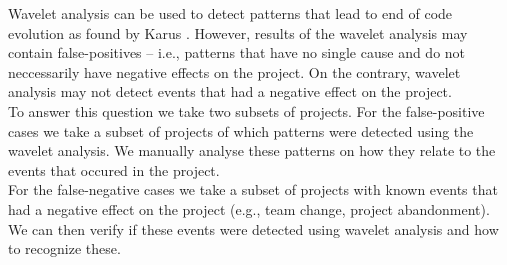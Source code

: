 Wavelet analysis can be used to detect patterns that lead to end of code
evolution as found by Karus \cite{karus2013}. However, results of the wavelet
analysis may contain false-positives -- i.e., patterns that have no single
cause and do not neccessarily have negative effects on the project.
On the contrary, wavelet analysis may not detect events that had a negative
effect on the project.
\\

To answer this question we take two subsets of projects. For the false-positive
cases we take a subset of projects of which patterns were detected using the
wavelet analysis. We manually analyse these patterns on how they relate to the
events that occured in the project.
\\

For the false-negative cases we take a subset of projects with known events that
had a negative effect on the project (e.g., team change, project abandonment).
We can then verify if these events were detected using wavelet analysis and how
to recognize these.
